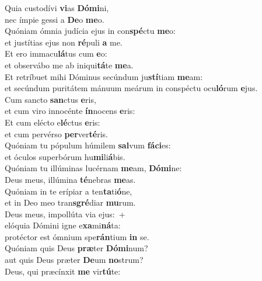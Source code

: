 \evenverse Quia custodívi \textbf{vi}as \textbf{Dó}\textbf{mi}ni,~\*\\
\evenverse nec ímpie gessi a \textbf{De}o \textbf{me}o.\\
\oddverse Quóniam ómnia judícia ejus in con\textbf{spé}ctu \textbf{me}o:~\*\\
\oddverse et justítias ejus non \textbf{ré}puli \textbf{a} me.\\
\evenverse Et ero immacu\textbf{lá}tus cum \textbf{e}o:~\*\\
\evenverse et observábo me ab iniqui\textbf{tá}te \textbf{me}a.\\
\oddverse Et retríbuet mihi Dóminus secúndum ju\textbf{stí}tiam \textbf{me}am:~\*\\
\oddverse et secúndum puritátem mánuum meárum in conspéctu ocu\textbf{ló}rum \textbf{e}jus.\\
\evenverse Cum sancto \textbf{san}ctus \textbf{e}ris,~\*\\
\evenverse et cum viro innocénte \textbf{ín}nocens \textbf{e}ris:\\
\oddverse Et cum elécto e\textbf{lé}ctus \textbf{e}ris:~\*\\
\oddverse et cum pervérso \textbf{per}ver\textbf{té}ris.\\
\evenverse Quóniam tu pópulum húmilem \textbf{sal}vum \textbf{fá}\textbf{ci}es:~\*\\
\evenverse et óculos superbórum hu\textbf{mi}li\textbf{á}bis.\\
\oddverse Quóniam tu illúminas lucérnam \textbf{me}am, \textbf{Dó}\textbf{mi}ne:~\*\\
\oddverse Deus meus, illúmina \textbf{té}nebras \textbf{me}as.\\
\evenverse Quóniam in te erípiar a ten\textbf{ta}ti\textbf{ó}ne,~\*\\
\evenverse et in Deo meo tran\textbf{sgré}diar \textbf{mu}rum.\\
\oddverse Deus meus, impollúta via ejus:~+\\
\oddverse  elóquia Dómini igne e\textbf{xa}mi\textbf{ná}ta:~\*\\
\oddverse protéctor est ómnium spe\textbf{rán}tium \textbf{in} se.\\
\evenverse Quóniam quis Deus \textbf{præ}ter \textbf{Dó}\textbf{mi}num?~\*\\
\evenverse aut quis Deus præter \textbf{De}um \textbf{no}strum?\\
\oddverse Deus, qui præcínxit \textbf{me} vir\textbf{tú}te:~\*\\
